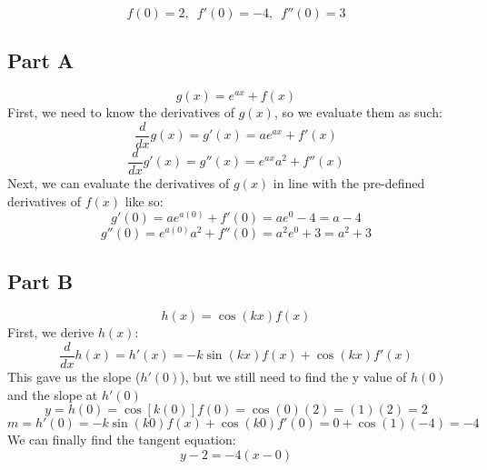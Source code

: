 \[ f(0) = 2, \enspace f'(0) = -4, \enspace f''(0) = 3 \]

\subsection{Part A}
\[ g(x) = e^{ax} + f(x) \]
First, we need to know the derivatives of $g(x)$, so we evaluate them as such:
\[ \frac{d}{dx} g(x) = g'(x) = ae^{ax} + f'(x) \]
\[ \frac{d}{dx} g'(x) = g''(x) = e^{ax}a^2 + f''(x) \]
Next, we can evaluate the derivatives of $g(x)$ in line with the pre-defined derivatives of $f(x)$ like so:
\[ g'(0) = ae^{a(0)} + f'(0) = ae^0 - 4 = a - 4 \]
\[ g''(0) = e^{a(0)}a^2 + f''(0) = a^2e^0 + 3 = a^2 + 3 \]
\subsection{Part B}
\[ h(x) = \cos{(kx)}f(x) \]
First, we derive $h(x)$:
\[ \frac{d}{dx} h(x) = h'(x) = -k\sin{(kx)}f(x) + \cos{(kx)}f'(x) \]
This gave us the slope ($h'(0)$), but we still need to find the y value of $h(0)$ and the slope at $h'(0)$
\[ y = h(0) = \cos{[k(0)]}f(0) = \cos{(0)}(2) = (1)(2) = 2 \]
\[ m = h'(0) = -k\sin{(k0)}f(x) + \cos{(k0)}f'(0) = 0 + \cos{(1)}(-4) = -4 \]
We can finally find the tangent equation:
\[ y - 2 = -4 ( x - 0 ) \]

